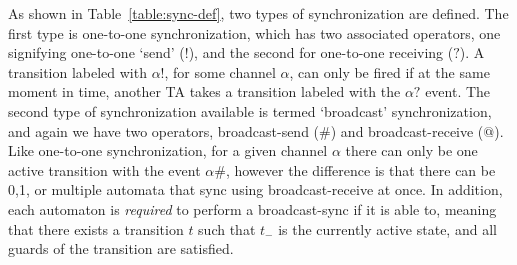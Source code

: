 \documentclass[a4paper,11pt]{report}
\theoremstyle{definition}
\begin{document}
As shown in Table~\ref{table:sync-def}, two types of synchronization are
defined. The first type is one-to-one synchronization, which has two associated
operators, one signifying one-to-one `send' (${!}$), and the second for
one-to-one receiving (${?}$). A transition labeled with $\alpha{!}$, for some
channel $\alpha$, can only be fired if at the same moment in time, another TA
takes a transition labeled with the $\alpha{?}$ event. The second type of
synchronization available is termed `broadcast' synchronization, and again we
have two operators, broadcast-send ($\#$) and broadcast-receive (${@}$). Like
one-to-one synchronization, for a given channel $\alpha$ there can only be one
active transition with the event $\alpha\#$, however the difference is that
there can be 0,1, or multiple automata that sync using broadcast-receive at
once. In addition, each automaton is \emph{required} to perform a broadcast-sync
if it is able to, meaning that there exists a transition $t$ such that $t_{-}$
is the currently active state, and all guards of the transition are satisfied.
\end{document}

